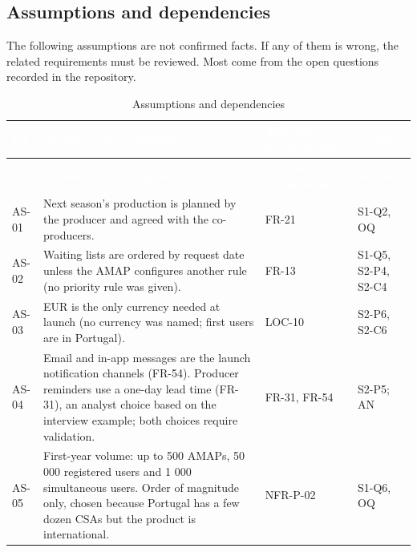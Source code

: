\documentclass[11pt,a4paper]{article}
\begin{document}
\subsection{Assumptions and dependencies}

The following assumptions are not confirmed facts. If any of them is wrong, the related requirements must be reviewed. Most come from the open questions recorded in the repository.

{\footnotesize
\begin{longtable}{>{\raggedright\arraybackslash\hspace{0pt}}p{}>{\raggedright\arraybackslash\hspace{0pt}}p{}>{\raggedright\arraybackslash\hspace{0pt}}p{}>{\raggedright\arraybackslash\hspace{0pt}}p{}}
\caption{Assumptions and dependencies}\\
\rowcolor{hdr}\textcolor{white}{\textbf{ID}} & \textcolor{white}{\textbf{Assumption or dependency}} & \textcolor{white}{\textbf{Affected requirements}} & \textcolor{white}{\textbf{Source}} \\ \endfirsthead
\rowcolor{hdr}\textcolor{white}{\textbf{ID}} & \textcolor{white}{\textbf{Assumption or dependency}} & \textcolor{white}{\textbf{Affected requirements}} & \textcolor{white}{\textbf{Source}} \\ \endhead
AS-01 & Next season's production is planned by the producer and agreed with the co-producers. & FR-21 & S1-Q2, OQ \\ \hline
AS-02 & Waiting lists are ordered by request date unless the AMAP configures another rule (no priority rule was given). & FR-13 & S1-Q5, S2-P4, S2-C4 \\ \hline
AS-03 & EUR is the only currency needed at launch (no currency was named; first users are in Portugal). & LOC-10 & S2-P6, S2-C6 \\ \hline
AS-04 & Email and in-app messages are the launch notification channels (FR-54). Producer reminders use a one-day lead time (FR-31), an analyst choice based on the interview example; both choices require validation. & FR-31, FR-54 & S2-P5; AN \\ \hline
AS-05 & First-year volume: up to 500 AMAPs, 50 000 registered users and 1 000 simultaneous users. Order of magnitude only, chosen because Portugal has a few dozen CSAs but the product is international. & NFR-P-02 & S1-Q6, OQ \\ \hline

\end{longtable}}
\end{document}
